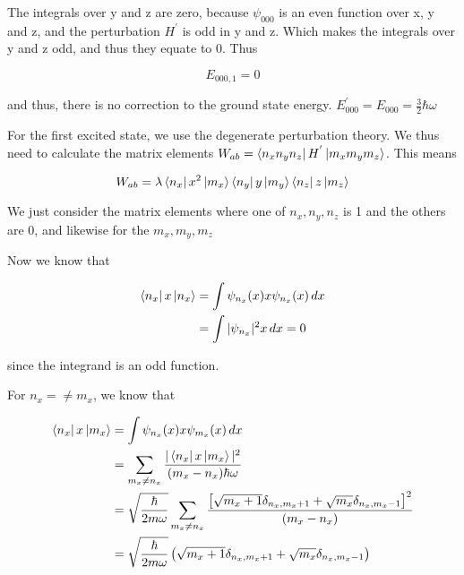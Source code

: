     The integrals over y and z are zero, because $\psi_{000}$ is an even function over x, y and z, and the perturbation $H^{'}$ is odd in y and z. Which makes the integrals over y and z odd, and thus they equate to 0. Thus

    \begin{equation*}
        E_{000,1} = 0
    \end{equation*}

    and thus, there is no correction to the ground state energy. $E^{'}_{000} = E_{000} = \frac{3}{2} \hbar \omega$

    For the first excited state, we use the degenerate perturbation theory. We thus need to calculate the matrix elements $W_{ab} = \bra{n_xn_yn_z}H^{'}\ket{m_xm_ym_z}$. This means

    \begin{equation*}
        W_{ab} = \lambda\bra{n_x}x^2\ket{m_x}\bra{n_y}y\ket{m_y}\bra{n_z}z\ket{m_z}
    \end{equation*}

    We just consider the matrix elements where one of $n_x , n_y , n_z$ is 1 and the others are 0, and likewise for the $m_x , m_y , m_z$

    Now we know that

    \begin{equation*}
        \begin{split}
            \bra{n_x}x\ket{n_x} & = \int \psi_{n_x}(x)x\psi_{n_x}(x) \, dx \\
            & = \int |\psi_{n_x}|^2 x \, dx = 0
        \end{split}
    \end{equation*}

    since the integrand is an odd function.

    For $n_x = \neq m_x$, we know that

    \begin{equation*}
        \begin{split}
            \bra{n_x}x\ket{m_x} & = \int \psi_{n_x}(x)x\psi_{m_x}(x) \, dx \\
            & = \sum_{m_x \neq n_x} \frac{|\bra{n_x}x\ket{m_x}|^2}{(m_x - n_x) \hbar\omega} \\
            & = \sqrt{\frac{\hbar}{2m\omega}} \sum_{m_x \neq n_x} \frac{\left[ \sqrt{m_x + 1}\delta_{n_x, m_x + 1} + \sqrt{m_x}\delta_{n_x, m_x - 1} \right]^2}{(m_x - n_x)} \\
            & = \sqrt{\frac{\hbar}{2m\omega}} \left( \sqrt{m_x + 1}\delta_{n_x, m_x + 1} + \sqrt{m_x}\delta_{n_x, m_x - 1} \right)
        \end{split}
    \end{equation*}

